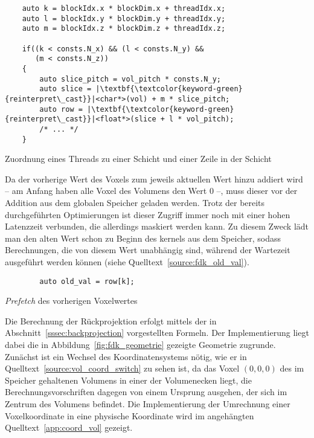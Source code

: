 \begin{listing}
\begin{verbatim}
    auto k = blockIdx.x * blockDim.x + threadIdx.x;
    auto l = blockIdx.y * blockDim.y + threadIdx.y;
    auto m = blockIdx.z * blockDim.z + threadIdx.z;

    if((k < consts.N_x) && (l < consts.N_y) &&
       (m < consts.N_z))
    {
        auto slice_pitch = vol_pitch * consts.N_y;
        auto slice = |\textbf{\textcolor{keyword-green}{reinterpret\_cast}}|<char*>(vol) + m * slice_pitch;
        auto row = |\textbf{\textcolor{keyword-green}{reinterpret\_cast}}|<float*>(slice + l * vol_pitch);
        /* ... */
    }    
\end{verbatim}
\caption{Zuordnung eines Threads zu einer Schicht und einer Zeile in der Schicht}
\label{source:vol_slice_row}
\end{listing}

Da der vorherige Wert des Voxels zum jeweils aktuellen Wert hinzu addiert wird -- am Anfang haben alle Voxel des
Volumens den Wert 0 --, muss dieser vor der Addition aus dem globalen Speicher geladen werden. Trotz der bereits
durchgeführten Optimierungen ist dieser Zugriff immer noch mit einer hohen Latenzzeit verbunden, die allerdings maskiert
werden kann. Zu diesem Zweck lädt man den alten Wert schon zu Beginn des \gls{kernel}s aus dem Speicher, sodass
Berechnungen, die von diesem Wert unabhängig sind, während der Wartezeit ausgeführt werden können (siehe
Quelltext~\ref{source:fdk_old_val}).

\begin{listing}
\begin{verbatim}
        auto old_val = row[k];
\end{verbatim}
\caption{\textit{Prefetch} des vorherigen Voxelwertes}
\label{source:fdk_old_val}
\end{listing}

Die Berechnung der Rückprojektion erfolgt mittels der in Abschnitt~\ref{sssec:backprojection} vorgestellten Formeln. Der
Implementierung liegt dabei die in Abbildung~\ref{fig:fdk_geometrie} gezeigte Geometrie zugrunde. Zunächst ist ein
Wechsel des Koordinatensystems nötig, wie er in Quelltext~\ref{source:vol_coord_switch} zu sehen ist, da das Voxel
$(0, 0, 0)$ des im Speicher gehaltenen Volumens in einer der Volumenecken liegt, die Berechnungsvorschriften dagegen von
einem Ursprung ausgehen, der sich im Zentrum des Volumens befindet. Die Implementierung der Umrechnung einer
Voxelkoordinate in eine physische Koordinate wird im angehängten Quelltext~\ref{app:coord_vol} gezeigt.

